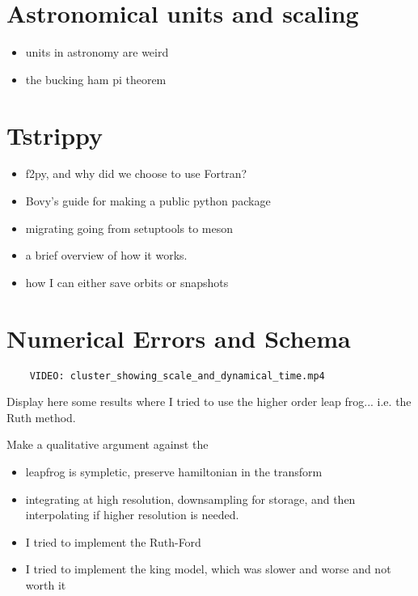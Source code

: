 \section{Astronomical units and scaling}
    \begin{itemize}
    \item units in astronomy are weird
    \item the bucking ham pi theorem 
    \end{itemize}



\section{Tstrippy}
    \begin{itemize}
        \item f2py, and why did we choose to use Fortran? 
        \item Bovy's guide for making a public python package
        \item migrating going from setuptools to meson
        \item a brief overview of how it works. 
        \item how I can either save orbits or snapshots
    \end{itemize}



\section{Numerical Errors and Schema} 

    \begin{verbatim}
    VIDEO: cluster_showing_scale_and_dynamical_time.mp4
    \end{verbatim}
    Display here some results where I tried to use the higher order leap frog... i.e. the Ruth method. 

    Make a qualitative argument against the 

    \begin{itemize}
        \item leapfrog is sympletic, preserve hamiltonian in the transform
        \item integrating at high resolution, downsampling for storage, and then interpolating if higher resolution is needed. 
        \item I tried to implement the Ruth-Ford
        \item I tried to implement the king model, which was slower and worse and not worth it 
    \end{itemize}


